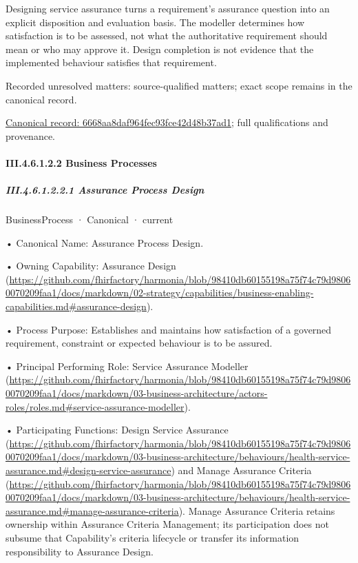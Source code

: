 Designing service assurance turns a requirement's assurance question into an explicit disposition and evaluation basis. The modeller determines how satisfaction is to be assessed, not what the authoritative requirement should mean or who may approve it. Design completion is not evidence that the implemented behaviour satisfies that requirement.


{\small Recorded unresolved matters: source-qualified matters; exact scope remains in the canonical record.}\par
{\footnotesize \href{../../../../../../../continuum/business/business-function/6668aa8daf964fec93fce42d48b37ad1.md}{Canonical record: 6668aa8daf964fec93fce42d48b37ad1}; full qualifications and provenance.}\par
\paragraph*{III.4.6.1.2.2 Business Processes}
\label{navigation:III.4.6.1.2.2}

\subparagraph*{III.4.6.1.2.2.1 Assurance Process Design}
\label{navigation:III.4.6.1.2.2.1}

\label{element:aec3177dcdd84961814f2ba4f688ad33}
{\small BusinessProcess · Canonical · current}\par

•
Canonical Name: Assurance Process Design.



•
Owning Capability: Assurance Design (\url{https://github.com/fhirfactory/harmonia/blob/98410db60155198a75f74c79d98060070209faa1/docs/markdown/02-strategy/capabilities/business-enabling-capabilities.md#assurance-design}).



•
Process Purpose: Establishes and maintains how satisfaction of a governed requirement, constraint or expected behaviour is to be assured.



•
Principal Performing Role: Service Assurance Modeller (\url{https://github.com/fhirfactory/harmonia/blob/98410db60155198a75f74c79d98060070209faa1/docs/markdown/03-business-architecture/actors-roles/roles.md#service-assurance-modeller}).



•
Participating Functions: Design Service Assurance (\url{https://github.com/fhirfactory/harmonia/blob/98410db60155198a75f74c79d98060070209faa1/docs/markdown/03-business-architecture/behaviours/health-service-assurance.md#design-service-assurance}) and Manage Assurance Criteria (\url{https://github.com/fhirfactory/harmonia/blob/98410db60155198a75f74c79d98060070209faa1/docs/markdown/03-business-architecture/behaviours/health-service-assurance.md#manage-assurance-criteria}). Manage Assurance Criteria retains ownership within Assurance Criteria Management; its participation does not subsume that Capability's criteria lifecycle or transfer its information responsibility to Assurance Design.



